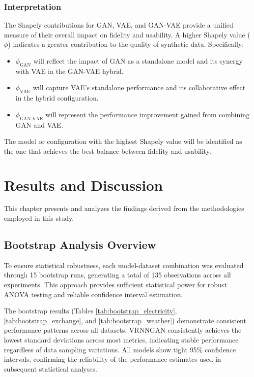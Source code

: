 \documentclass{article}
\begin{document}
\subsubsection{Interpretation}
The Shapely contributions for GAN, VAE, and GAN-VAE provide a unified measure of their overall impact on fidelity and usability. A higher Shapely value (\(\phi\)) indicates a greater contribution to the quality of synthetic data. Specifically:
\begin{itemize}
    \item \(\phi_{\text{GAN}}\) will reflect the impact of GAN as a standalone model and its synergy with VAE in the GAN-VAE hybrid.
    \item \(\phi_{\text{VAE}}\) will capture VAE’s standalone performance and its collaborative effect in the hybrid configuration.
    \item \(\phi_{\text{GAN-VAE}}\) will represent the performance improvement gained from combining GAN and VAE.
\end{itemize}
The model or configuration with the highest Shapely value will be identified as the one that achieves the best balance between fidelity and usability. 

\newpage

\section{Results and Discussion}

This chapter presents and analyzes the findings derived from the methodologies employed in this study.

\subsection{Bootstrap Analysis Overview}
To ensure statistical robustness, each model-dataset combination was evaluated through 15 bootstrap runs, generating a total of 135 observations across all experiments. This approach provides sufficient statistical power for robust ANOVA testing and reliable confidence interval estimation.

The bootstrap results (Tables \ref{tab:bootstrap_electricity}, \ref{tab:bootstrap_exchange}, and \ref{tab:bootstrap_weather}) demonstrate consistent performance patterns across all datasets. VRNNGAN consistently achieves the lowest standard deviations across most metrics, indicating stable performance regardless of data sampling variations. All models show tight 95\% confidence intervals, confirming the reliability of the performance estimates used in subsequent statistical analyses.
\end{document}
